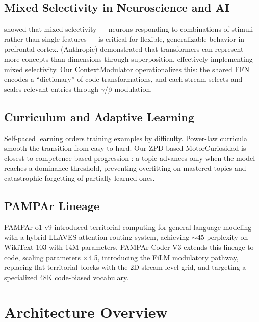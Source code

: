 \documentclass[11pt,a4paper]{article}
\begin{document}
\subsection{Mixed Selectivity in Neuroscience and AI}

\citet{rigotti2013importance} showed that mixed selectivity — neurons
responding to combinations of stimuli rather than single features — is
critical for flexible, generalizable behavior in prefrontal cortex.
\citet{elhage2022toy} (Anthropic) demonstrated that transformers can
represent more concepts than dimensions through superposition, effectively
implementing mixed selectivity.  Our ContextModulator operationalizes this:
the shared FFN encodes a ``dictionary'' of code transformations, and each
stream selects and scales relevant entries through $\gamma/\beta$ modulation.

\subsection{Curriculum and Adaptive Learning}

Self-paced learning \citep{kumar2010self} orders training examples by
difficulty.  Power-law curricula \citep{bengio2009curriculum} smooth the
transition from easy to hard.  Our ZPD-based MotorCuriosidad is closest to
competence-based progression \citep{florensa2017reverse}: a topic advances
only when the model reaches a dominance threshold, preventing overfitting on
mastered topics and catastrophic forgetting of partially learned ones.

\subsection{PAMPAr Lineage}

PAMPAr-o1 v9 \citep{mella2026pampar} introduced territorial computing for
general language modeling with a hybrid LLAVES-attention routing system,
achieving $\sim$45 perplexity on WikiText-103 with 14M parameters.
PAMPAr-Coder V3 extends this lineage to code, scaling parameters $\times$4.5,
introducing the FiLM modulatory pathway, replacing flat territorial blocks with
the 2D stream-level grid, and targeting a specialized 48K code-biased
vocabulary.

\section{Architecture Overview}
\label{sec:architecture}
\end{document}
